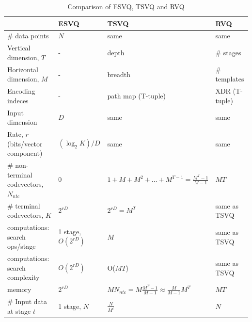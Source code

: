 \begin{table}[htp]
\begin{longtable}{| p{2.2in} || p{1in} | p{1.5in} | p{1.5in}|}
\hline
											&ESVQ						&TSVQ																&RVQ								\\ 
\hline
\# data points								&$N$						&same																&same								\\ 
\hline
Vertical dimension, $T$					&-							&depth																&\# stages							\\
Horizontal dimension, $M$					&-							&breadth															&\# templates						\\
Encoding indeces							&-							&path map	(T-tuple)												&XDR (T-tuple)						\\ 
\hline
Input dimension							&$D$						&same																&same								\\
Rate, $r$ (bits/vector component)			&$(\log_2K)/D$			&same																&same								\\ 
\hline
\# non-terminal codevectors, $N_{ntc}$	&0							&$1+M+M^2+ \ldots + M^{T-1}=\frac{M^T-1}{M-1}$			&$MT$								\\
\# terminal codevectors, $K$				&$2^{rD}$					&$2^{rD}=M^T$													&same as TSVQ					\\
\hline
computations: search ops/stage			&1 stage, $O(2^{rD})$	&$M$																&same as TSVQ					\\
computations: search complexity 			&$O(2^{rD})$				&O($MT$)															&same  as TSVQ					\\ 
memory 									&$2^{rD}$					&$MN_{ntc} = M\frac{M^T-1}{M-1}\approx\frac{M}{M-1}M^T$ &$MT$								\\ 
\hline
\# Input data at stage $t$					&1 stage, $N$				&$\frac{N}{M^t}$													&$N$								\\
\hline
\end{longtable}
\caption{Comparison of ESVQ, TSVQ and RVQ}
\label{tab:comparison_ESVQ_TSVQ_RVQ}
\end{table}
